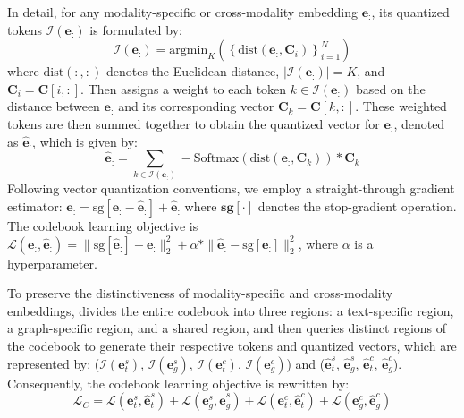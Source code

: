 In detail, for any modality-specific or cross-modality embedding $\mathbf{e}_{:}$, its quantized tokens $\mathcal{I}(\mathbf{e}_{:})$ is formulated by:
\begin{equation}
\label{k_tokens}
    \mathcal{I}(\mathbf{e}_{:}) = \mathrm{argmin}_{K}\left( \left\{\text{dist}(\mathbf{e}_{:}, \mathbf{C}_i)\right\}_{i=1}^{N} \right)
\end{equation}
where $\text{dist}(:, :)$ denotes the Euclidean distance, $| \mathcal{I}(\mathbf{e}_{:}) | = K$, and $\mathbf{C}_{i} = \mathbf{C}[i,:]$. Then \model assigns a weight to each token $k \in \mathcal{I}(\mathbf{e}_{:})$ based on the distance between \( \mathbf{e}_{:} \) and its corresponding vector \( \mathbf{C}_{k} = \mathbf{C}[k,:] \). These weighted tokens are then summed together to obtain the quantized vector for \( \mathbf{e}_{:} \), denoted as \( \mathbf{\hat{e}}_{:} \), which is given by:
\begin{equation}
    \mathbf{\hat{e}_{:}} = \sum_{k \in \mathcal{I}(\mathbf{e}_{:})} -\mathrm{Softmax}(\mathrm{dist}(\mathbf{e}_{:}, \mathbf{C}_{k})) * \mathbf{C}_{k}
\end{equation}
%
Following vector quantization conventions, we employ a straight-through gradient estimator: $\mathbf{e}_{:} = \mathrm{sg}[\mathbf{e}_{:} - \mathbf{\hat{e}}_{:}] + \mathbf{\hat{e}}_{:}$ where $\mathbf{sg}[\cdot]$ denotes the stop-gradient operation. The codebook learning objective is $\mathcal{L}(\mathbf{e}_{:}, \mathbf{\hat{e}}_{:}) = \|\mathrm{sg}[\mathbf{\hat{e}}_{:}] - \mathbf{e}_{:}\|_2^2 + \alpha * \|\mathbf{\hat{e}}_{:} - \mathrm{sg}[\mathbf{e}_{:}]\|_2^2$, where $\alpha$ is a hyperparameter.

To preserve the distinctiveness of modality-specific and cross-modality embeddings, \model divides the entire codebook into three regions: a text-specific region, a graph-specific region, and a shared region, and then queries distinct regions of the codebook to generate their respective tokens and quantized vectors, which are represented by: ($\mathcal{I}(\mathbf{e}_{t}^{s})$, $\mathcal{I}(\mathbf{e}_{g}^{s})$, $\mathcal{I}(\mathbf{e}_{t}^{c})$, $\mathcal{I}(\mathbf{e}_{g}^{c})$) and (\( \mathbf{\hat{e}}_{t}^{s} \), \( \mathbf{\hat{e}}_{g}^{s} \), \( \mathbf{\hat{e}}_{t}^{c} \), \( \mathbf{\hat{e}}_{g}^{c} \)). Consequently, the codebook learning objective is rewritten by:
\begin{equation}
    \mathcal{L}_{C} = \mathcal{L}(\mathbf{e}_{t}^{s}, \mathbf{\hat{e}}_{t}^{s}) + \mathcal{L}(\mathbf{e}_{g}^{s}, \mathbf{\hat{e}}_{g}^{s}) + \mathcal{L}(\mathbf{e}_{t}^{c}, \mathbf{\hat{e}}_{t}^{c}) + \mathcal{L}(\mathbf{e}_{g}^{c}, \mathbf{\hat{e}}_{g}^{c})
\end{equation}

